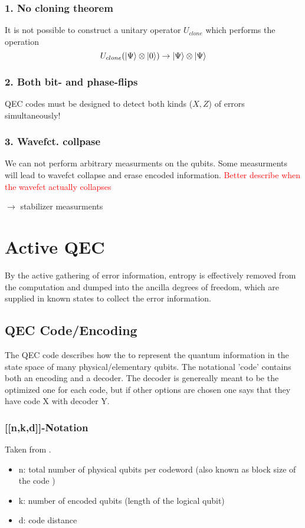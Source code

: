 \subsubsection{1. No cloning theorem}
It is not possible to construct a unitary operator $U_{clone}$ which performs the operation
\begin{equation}
    U_{clone}(\ket{\Psi} \otimes \ket{0}) \rightarrow \ket{\Psi} \otimes\ket{\Psi}
\end{equation}


\subsubsection{2. Both bit- and phase-flips}
QEC codes must be designed to detect both kinds ($X,Z$) of errors simultaneously!


\subsubsection{3. Wavefct. collpase}
We can not perform arbitrary measurments on the qubits. 
Some measurments will lead to wavefct collapse and erase encoded information.
\textcolor{red}{Better describe when the wavefct actually collapses}

$\rightarrow$ stabilizer measurments


\section{Active QEC}
By the active gathering of error information, entropy is effectively removed from the computation and dumped into the ancilla degrees of freedom, which are supplied in known states to collect the error information. \cite{QECmemory}


\subsection{QEC Code/Encoding}
The QEC code describes how the to represent the quantum information in the state space of many physical/elementary qubits. \cite{QECmemory}
The notational 'code' contains both an encoding and a decoder.
The decoder is genereally meant to be the optimized one for each code, but if other options are chosen one says that they have code X with decoder Y.


\subsubsection{[[n,k,d]]-Notation}\label{sssec:nkd_notation}
Taken from \cite{QECintro}.
\begin{itemize}
    \item n: total number of physical qubits per codeword (also known as block size of the code \cite{QECmemory})
    \item k: number of encoded qubits (length of the logical qubit)
    \item d: code distance
\end{itemize}


